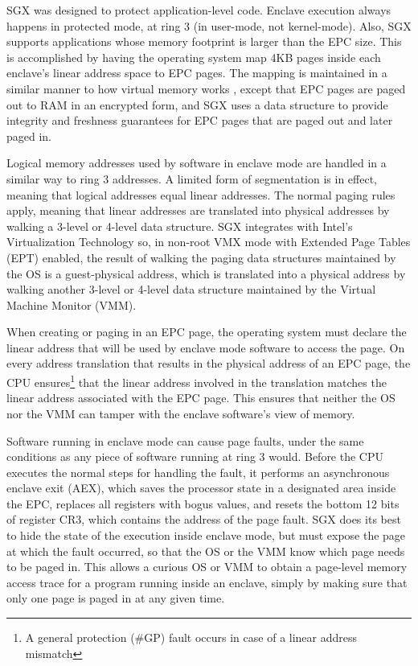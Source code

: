 SGX was designed to protect application-level code. Enclave execution always
happens in protected mode, at ring 3 (in user-mode, not kernel-mode). Also, SGX
supports applications whose memory footprint is larger than the EPC size. This
is accomplished by having the operating system map 4KB pages inside each
enclave's linear address space to EPC pages. The mapping is maintained in a
similar manner to how virtual memory works \cite{jacob1998virtual}, except that
EPC pages are paged out to RAM in an encrypted form, and SGX uses a data
structure to provide integrity and freshness guarantees for EPC pages that are
paged out and later paged in.

Logical memory addresses used by software in enclave mode are handled in a
similar way to ring 3 addresses. A limited form of segmentation is in effect,
meaning that logical addresses equal linear addresses. The normal paging rules
apply, meaning that linear addresses are translated into physical addresses
by walking a 3-level or 4-level data structure. SGX integrates with Intel's
Virtualization Technology \cite{uhlig2005intel} so, in non-root VMX mode with
Extended Page Tables (EPT) enabled, the result of walking the paging data
structures maintained by the OS is a guest-physical address, which is
translated into a physical address by walking another 3-level or 4-level
data structure maintained by the Virtual Machine Monitor (VMM).

When creating or paging in an EPC page, the operating system must declare the
linear address that will be used by enclave mode software to access the page.
On every address translation that results in the physical address of an EPC
page, the CPU ensures\footnote{A general protection (\#GP) fault occurs in case
of a linear address mismatch} that the linear address involved in the
translation matches the linear address associated with the EPC page. This
ensures that neither the OS nor the VMM can tamper with the enclave software's
view of memory.

Software running in enclave mode can cause page faults, under the same
conditions as any piece of software running at ring 3 would. Before the CPU
executes the normal steps for handling the fault, it performs an asynchronous
enclave exit (AEX), which saves the processor state in a designated area inside
the EPC, replaces all registers with bogus values, and resets the bottom 12
bits of register CR3, which contains the address of the page fault. SGX does
its best to hide the state of the execution inside enclave mode, but must
expose the page at which the fault occurred, so that the OS or the VMM know
which page needs to be paged in. This allows a curious OS or VMM to obtain a
page-level memory access trace for a program running inside an enclave, simply
by making sure that only one page is paged in at any given time.

